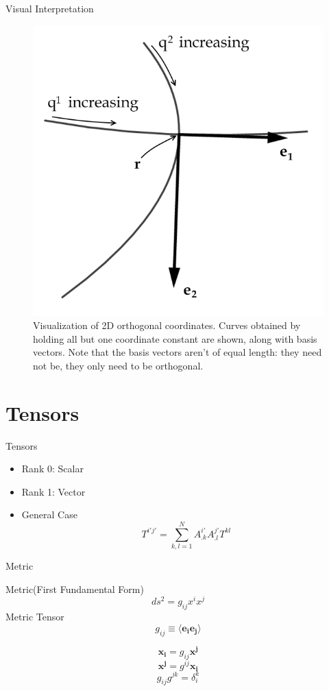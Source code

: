 \documentclass{beamer}
\begin{document}
\begin{frame}{Visual Interpretation}
	\begin{figure}[h!]
		\centering
		\includegraphics[scale=0.25]{OrthogonalCoordinates.png}
		\caption{\tiny Visualization of 2D orthogonal coordinates. Curves obtained by holding all but one coordinate constant are shown, along 
		with basis vectors. Note that the basis vectors aren't of equal length: they need not be, they only need to be orthogonal.}
		\centering
	\end{figure}
\end{frame}

\section{Tensors}
\begin{frame}{Tensors}
	\begin{itemize}
		\item
			Rank 0: Scalar
		\item
			Rank 1: Vector
		\item
			General Case
			\[ \displaystyle T^{i' j'} = \sum_{k,l=1}^N A^{i'}_{.k} A^{j'}_{.l} T^{kl} \]
	\end{itemize}

\end{frame}
\begin{frame}{Metric}
	\begin{definition}
		Metric(First Fundamental Form)
		\[ ds^2 = g_{ij} x^i x^j \]
		Metric Tensor
		\[ g_{ij} \equiv \langle \mathbf{e_i} \mathbf{e_j} \rangle \]
	\end{definition}
	\[ \mathbf{x_i} = g_{ij} \mathbf{x^j} \]
	\[ \mathbf{x^j} = g^{ij} \mathbf{x_i} \]
	\[ g_{ij} g^{jk} = \delta^k_i \]
\end{frame}
\end{document}
